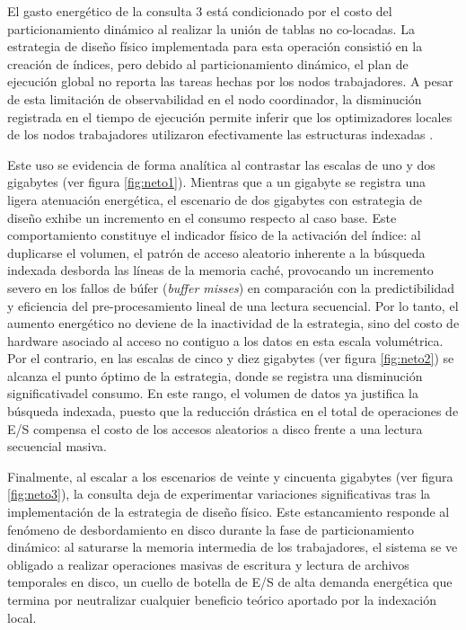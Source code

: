 \documentclass[12pt, letter paper]{report}
\begin{document}
        El gasto energético de la consulta 3 está condicionado por el costo del
        particionamiento dinámico al realizar la unión de tablas no co-locadas.
        La estrategia de diseño físico implementada para esta operación
        consistió en la creación de índices, pero debido al particionamiento
        dinámico, el plan de ejecución global no reporta las tareas hechas por
        los nodos trabajadores. A pesar de esta limitación de observabilidad en
        el nodo coordinador, la disminución registrada en el tiempo de ejecución
        permite inferir que los optimizadores locales de los nodos trabajadores
        utilizaron efectivamente las estructuras indexadas
        \cite{citus_query_processing, citus_performance_tuning}.

        Este uso se evidencia de forma analítica al contrastar las escalas de 
        uno y dos gigabytes (ver figura \ref{fig:neto1}). Mientras que a un
        gigabyte se registra una ligera atenuación energética, el escenario de
        dos gigabytes con estrategia de diseño exhibe un incremento en el
        consumo respecto al caso base. Este comportamiento constituye el
        indicador físico de la activación del índice: al duplicarse el volumen,
        el patrón de acceso aleatorio inherente a la búsqueda indexada desborda
        las líneas de la memoria caché, provocando un incremento severo en los
        fallos de búfer (\textit{buffer misses}) en comparación con la
        predictibilidad y eficiencia del pre-procesamiento lineal de una lectura
        secuencial. Por lo tanto, el aumento energético no deviene de la
        inactividad de la estrategia, sino del costo de hardware asociado al
        acceso no contiguo a los datos en esta escala volumétrica. Por el
        contrario, en las escalas de cinco y diez gigabytes (ver figura
        \ref{fig:neto2}) se alcanza el punto óptimo de la estrategia, donde se
        registra una disminución significativadel consumo. En este rango, el
        volumen de datos ya justifica la búsqueda indexada, puesto que la
        reducción drástica en el total de operaciones de E/S compensa el costo
        de los accesos aleatorios a disco frente a una lectura secuencial
        masiva.

        Finalmente, al escalar a los escenarios de veinte y cincuenta gigabytes
        (ver figura \ref{fig:neto3}), la consulta deja de experimentar
        variaciones significativas tras la implementación de la estrategia de
        diseño físico. Este estancamiento responde al fenómeno de desbordamiento
        en disco durante la fase de particionamiento dinámico: al saturarse la
        memoria intermedia de los trabajadores, el sistema se ve obligado a
        realizar operaciones masivas de escritura y lectura de archivos
        temporales en disco, un cuello de botella de E/S de alta demanda
        energética que termina por neutralizar cualquier beneficio teórico
        aportado por la indexación local.
\end{document}
